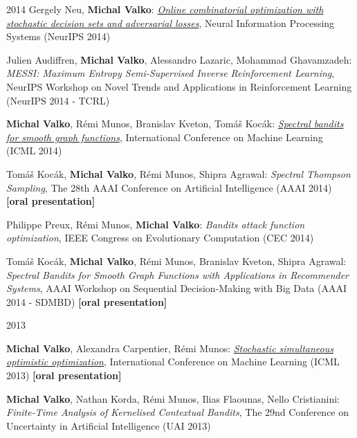 \documentclass{resume}
\begin{document}
\begin{category}{2014}
\citembullet
Gergely Neu, {\bf Michal Valko}: 
\href{http://researchers.lille.inria.fr/~valko/hp/serve.php?what=publications/calandriello2018improved.pdf}
{\emph{Online combinatorial optimization with stochastic decision sets and adversarial losses}}, 
Neural Information 
Processing Systems ({\sf NeurIPS 2014})

\citembullet
Julien Audiffren, {\bf Michal Valko},  Alessandro Lazaric, Mohammad Ghavamzadeh:
\emph{MESSI: Maximum Entropy Semi-Supervised Inverse Reinforcement Learning},
 NeurIPS Workshop on Novel Trends and Applications in Reinforcement Learning
({\sf NeurIPS 2014 - TCRL}) 


\citembullet
{\bf Michal Valko}, R\' emi Munos, Branislav Kveton, Tom\'a\v s Koc\' ak:
\href{http://researchers.lille.inria.fr/~valko/hp/serve.php?what=publications/valko2014spectral.pdf}
{\emph{Spectral bandits for smooth graph functions}},
International Conference on Machine Learning
({\sf ICML 2014}) 

\citembullet
Tom\'a\v s Koc\' ak, {\bf Michal Valko},  R\' emi Munos, Shipra Agrawal:
\emph{Spectral Thompson Sampling},
 The 28th AAAI Conference on Artificial Intelligence 
({\sf AAAI 2014}) {\bf [oral presentation]}

\citembullet
Philippe Preux, R\' emi Munos, {\bf Michal Valko}:
\emph{Bandits attack function optimization},
IEEE Congress on Evolutionary Computation
({\sf CEC 2014}) 


\citembullet
Tom\'a\v s Koc\' ak, {\bf Michal Valko},  R\' emi Munos, Branislav Kveton, 
Shipra Agrawal:
\emph{Spectral Bandits for Smooth Graph Functions with Applications in 
Recommender Systems},
 AAAI Workshop on Sequential Decision-Making with Big Data 
({\sf AAAI 2014 - SDMBD}) {\bf [oral presentation]}



\end{category}\begin{category}{2013}

\citembullet
{\bf Michal Valko}, Alexandra Carpentier, R\' emi Munos:
\href{http://researchers.lille.inria.fr/~valko/hp/serve.php?what=publications/valko2013stochastic.pdf}
{\emph{Stochastic simultaneous optimistic optimization}},
International Conference on Machine Learning
({\sf ICML 2013}) {\bf [oral presentation]}

\citembullet
{\bf Michal Valko}, Nathan Korda, R\' emi Munos, Ilias Flaounas, Nello 
Cristianini:
\emph{Finite-Time Analysis of Kernelised Contextual Bandits},
The 29nd Conference on Uncertainty in Artificial Intelligence
({\sf UAI 2013})


\end{category}
\end{document}
